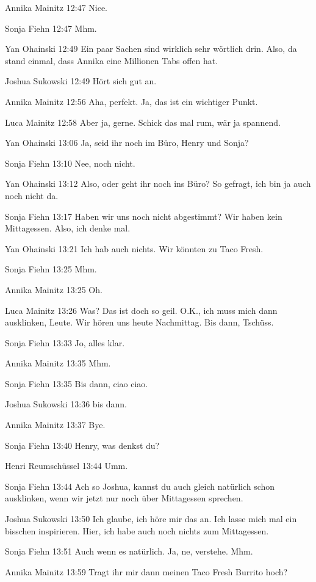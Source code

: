 Annika Mainitz   12:47
Nice.

Sonja Fiehn   12:47
Mhm.

Yan Ohainski   12:49
Ein paar Sachen sind wirklich sehr wörtlich drin. Also, da stand einmal, dass Annika eine Millionen Tabs offen hat.

Joshua Sukowski   12:49
Hört sich gut an.

Annika Mainitz   12:56
Aha, perfekt. Ja, das ist ein wichtiger Punkt.

Luca Mainitz   12:58
Aber ja, gerne.
Schick das mal rum, wär ja spannend.

Yan Ohainski   13:06
Ja, seid ihr noch im Büro, Henry und Sonja?

Sonja Fiehn   13:10
Nee, noch nicht.

Yan Ohainski   13:12
Also, oder geht ihr noch ins Büro? So gefragt, ich bin ja auch noch nicht da.

Sonja Fiehn   13:17
Haben wir uns noch nicht abgestimmt? Wir haben kein Mittagessen. Also, ich denke mal.

Yan Ohainski   13:21
Ich hab auch nichts. Wir könnten zu Taco Fresh.

Sonja Fiehn   13:25
Mhm.

Annika Mainitz   13:25
Oh.

Luca Mainitz   13:26
Was? Das ist doch so geil. O.K., ich muss mich dann ausklinken, Leute. Wir hören uns heute Nachmittag. Bis dann, Tschüss.

Sonja Fiehn   13:33
Jo, alles klar.

Annika Mainitz   13:35
Mhm.

Sonja Fiehn   13:35
Bis dann, ciao ciao.

Joshua Sukowski   13:36
bis dann.

Annika Mainitz   13:37
Bye.

Sonja Fiehn   13:40
Henry, was denkst du?

Henri Reumschüssel   13:44
Umm.

Sonja Fiehn   13:44
Ach so Joshua, kannst du auch gleich natürlich schon ausklinken, wenn wir jetzt nur noch über Mittagessen sprechen.

Joshua Sukowski   13:50
Ich glaube, ich höre mir das an. Ich lasse mich mal ein bisschen inspirieren. Hier, ich habe auch noch nichts zum Mittagessen.

Sonja Fiehn   13:51
Auch wenn es natürlich. Ja, ne, verstehe.
Mhm.

Annika Mainitz   13:59
Tragt ihr mir dann meinen Taco Fresh Burrito hoch?

